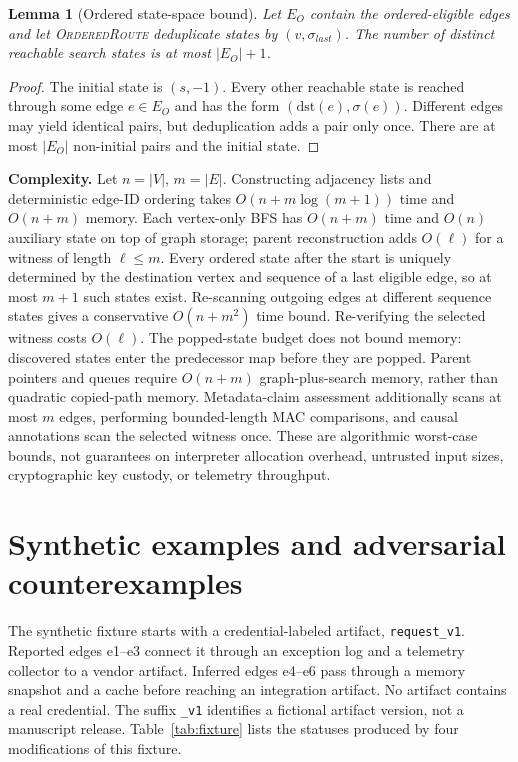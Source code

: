 \documentclass[11pt,letterpaper]{article}
\newtheorem{lemma}{Lemma}
\newcommand{\code}[1]{\texttt{#1}}
\begin{document}
\begin{lemma}[Ordered state-space bound]\label{lem:states}
Let \(E_O\) contain the ordered-eligible edges and let
\textup{\textsc{OrderedRoute}} deduplicate states by \((v,\sigma_{last})\). The number
of distinct reachable search states is at most \(|E_O|+1\).
\end{lemma}
\begin{proof}
The initial state is \((s,-1)\). Every other reachable state
is reached through some edge \(e\in E_O\) and has the form
\((\mathrm{dst}(e),\sigma(e))\). Different edges may yield identical pairs,
but deduplication adds a pair only once. There are at most \(|E_O|\)
non-initial pairs and the initial state.
\end{proof}

\textbf{Complexity.} Let \(n=|V|\), \(m=|E|\). Constructing adjacency lists and deterministic edge-ID ordering takes \(O(n+m\log(m+1))\) time and \(O(n+m)\) memory. Each vertex-only BFS has \(O(n+m)\) time and \(O(n)\) auxiliary state on top of graph storage; parent reconstruction adds \(O(\ell)\) for a witness of length \(\ell\le m\). Every ordered state after the start is uniquely determined by the destination vertex and sequence of a last eligible edge, so at most \(m+1\) such states exist. Re-scanning outgoing edges at different sequence states gives a conservative \(O(n+m^2)\) time bound. Re-verifying the selected witness costs \(O(\ell)\). The popped-state budget does not bound memory: discovered states enter the predecessor map before they are popped. Parent pointers and queues require \(O(n+m)\) graph-plus-search memory, rather than quadratic copied-path memory. Metadata-claim assessment additionally scans at most \(m\) edges, performing bounded-length MAC comparisons, and causal annotations scan the selected witness once. These are algorithmic worst-case bounds, not guarantees on interpreter allocation overhead, untrusted input sizes, cryptographic key custody, or telemetry throughput.

\section{Synthetic examples and adversarial counterexamples}\label{sec:examples}
The synthetic fixture starts with a credential-labeled artifact, \code{request\_v1}. Reported edges e1--e3 connect it through an exception log and a telemetry collector to a vendor artifact. Inferred edges e4--e6 pass through a memory snapshot and a cache before reaching an integration artifact. No artifact contains a real credential. The suffix \code{\_v1} identifies a fictional artifact version, not a manuscript release. Table~\ref{tab:fixture} lists the statuses produced by four modifications of this fixture.
\end{document}
